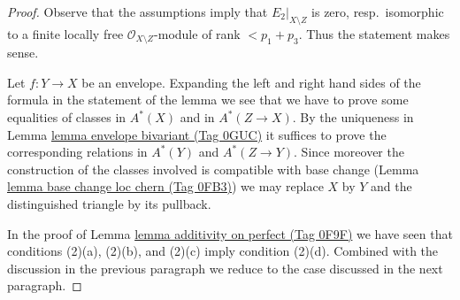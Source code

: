 \documentclass{amsart}
\theoremstyle{plain}
\theoremstyle{definition}
\theoremstyle{remark}
\numberwithin{equation}{subsection}
\begin{document}
\begin{proof}
Observe that the assumptions imply that $E_2|_{X \setminus Z}$ is zero,
resp.\ isomorphic to a finite locally free $\mathcal{O}_{X \setminus Z}$-module
of rank $< p_1 + p_3$. Thus the statement makes sense.

\medskip\noindent
Let $f : Y \to X$ be an envelope. Expanding the left and right hand sides
of the formula in the statement of the lemma we see that we have to prove
some equalities of classes in $A^*(X)$ and in $A^*(Z \to X)$. By the
uniqueness in Lemma \href{https://stacks.math.columbia.edu/tag/0GUC}{lemma envelope bivariant (Tag 0GUC)} it suffices to prove the
corresponding relations in $A^*(Y)$ and $A^*(Z \to Y)$. Since moreover
the construction of the classes involved is compatible with base change
(Lemma \href{https://stacks.math.columbia.edu/tag/0FB3}{lemma base change loc chern (Tag 0FB3)}) we may replace $X$ by $Y$
and the distinguished triangle by its pullback.

\medskip\noindent
In the proof of Lemma \href{https://stacks.math.columbia.edu/tag/0F9F}{lemma additivity on perfect (Tag 0F9F)} we have
seen that conditions (2)(a), (2)(b), and (2)(c) imply condition
(2)(d). Combined with the discussion in the previous paragraph we
reduce to the case discussed in the next paragraph.


\end{proof}
\end{document}
